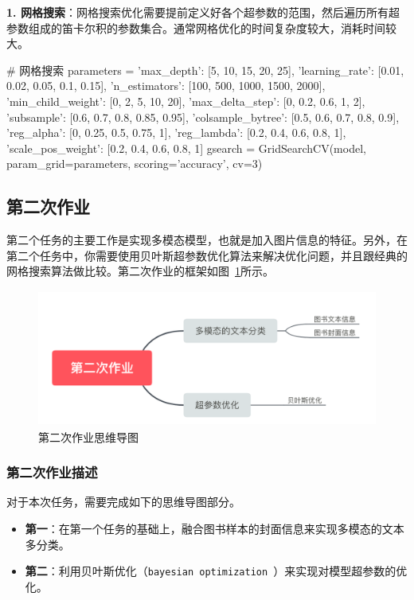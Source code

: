 \noindent \textbf{1. 网格搜索}：网格搜索优化需要提前定义好各个超参数的范围，然后遍历所有超参数组成的笛卡尔积的参数集合。通常网格优化的时间复杂度较大，消耗时间较大。
\begin{python}
# 网格搜索
parameters = {
    'max_depth': [5, 10, 15, 20, 25],
    'learning_rate': [0.01, 0.02, 0.05, 0.1, 0.15],
    'n_estimators': [100, 500, 1000, 1500, 2000],
    'min_child_weight': [0, 2, 5, 10, 20],
    'max_delta_step': [0, 0.2, 0.6, 1, 2],
    'subsample': [0.6, 0.7, 0.8, 0.85, 0.95],
    'colsample_bytree': [0.5, 0.6, 0.7, 0.8, 0.9],
    'reg_alpha': [0, 0.25, 0.5, 0.75, 1],
    'reg_lambda': [0.2, 0.4, 0.6, 0.8, 1],
    'scale_pos_weight': [0.2, 0.4, 0.6, 0.8, 1]
}
gsearch = GridSearchCV(model, param_grid=parameters, scoring='accuracy', cv=3)
\end{python}

\subsection{第二次作业}

\noindent 第二个任务的主要工作是实现多模态模型，也就是加入图片信息的特征。另外，在第二个任务中，你需要使用贝叶斯超参数优化算法来解决优化问题，并且跟经典的网格搜索算法做比较。第二次作业的框架如图~\ref{fig:book_task2_mindmap}所示。 

\begin{figure}[ht]
 \centering
 \includegraphics[height=4.5cm]{images/book_task2_mindmap.jpg}
 \caption{第二次作业思维导图}
 \label{fig:book_task2_mindmap}
\end{figure}


\subsubsection{第二次作业描述}

\noindent 对于本次任务，需要完成如下的思维导图部分。

\begin{itemize}
    \item \textbf{第一}：在第一个任务的基础上，融合图书样本的封面信息来实现多模态的文本多分类。
    \item \textbf{第二}：利用贝叶斯优化（\texttt{bayesian optimization~\cite{snoek2012practical}}）来实现对模型超参数的优化。
\end{itemize}


